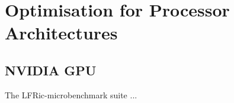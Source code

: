 \section{Optimisation for Processor Architectures
\label{sec:pa}}

\subsection{NVIDIA GPU}
The LFRic-microbenchmark suite ...



